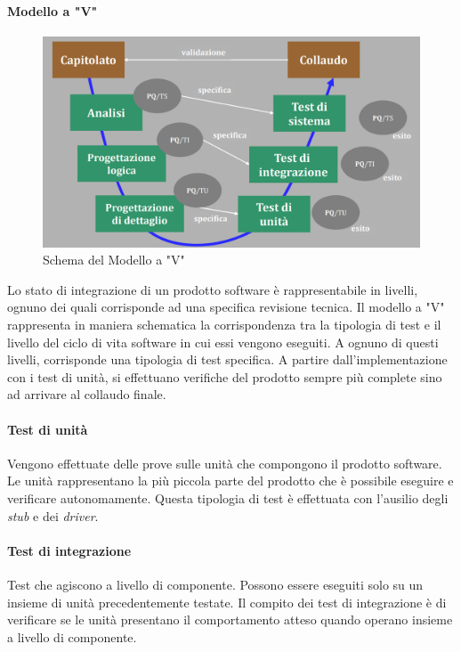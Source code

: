 \paragraph{Modello a "V"}
\begin{figure}[h!]
	\caption{Schema del Modello a "V"}
	\centering
	\includegraphics[width=\textwidth]{res/img/modelloV.png}
\end{figure}
Lo stato di integrazione di un prodotto software è rappresentabile in livelli, ognuno dei quali corrisponde ad una specifica revisione tecnica. Il modello a "V" rappresenta in maniera schematica la corrispondenza tra la tipologia di test e il livello del ciclo di vita software in cui essi vengono eseguiti. A ognuno di questi livelli, corrisponde una tipologia di test specifica. A partire dall'implementazione con i test di unità, si effettuano verifiche del prodotto sempre più complete sino ad arrivare al collaudo finale.

\paragraph{Test di unità}
Vengono effettuate delle prove sulle unità che compongono il prodotto software. Le unità rappresentano la più piccola parte del prodotto che è possibile eseguire e verificare autonomamente. Questa tipologia di test è effettuata con l'ausilio degli \textit{stub\glo} e dei \textit{driver\glos}.

\paragraph{Test di integrazione}
Test che agiscono a livello di componente. Possono essere eseguiti solo su un insieme di unità precedentemente testate. Il compito dei test di integrazione è di verificare se le unità presentano il comportamento atteso quando operano insieme a livello di componente.

